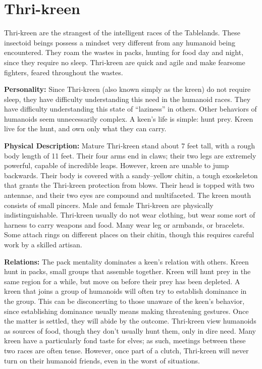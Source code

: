 \section{Thri-kreen}

Thri‐kreen are the strangest of the intelligent races of the Tablelands. These insectoid beings possess a mindset very different from any humanoid being encountered. They roam the wastes in packs, hunting for food day and night, since they require no sleep. Thri‐kreen are quick and agile and make fearsome fighters, feared throughout the wastes.

\textbf{Personality:} Since Thri‐kreen (also known simply as the kreen) do not require sleep, they have difficulty understanding this need in the humanoid races. They have difficulty understanding this state of “laziness” in others. Other behaviors of humanoids seem unnecessarily complex. A keen’s life is simple: hunt prey. Kreen live for the hunt, and own only what they can carry.

\textbf{Physical Description:} Mature Thri‐kreen stand about 7 feet tall, with a rough body length of 11 feet. Their four arms end in claws; their two legs are extremely powerful, capable of incredible leaps. However, kreen are unable to jump backwards. Their body is covered with a sandy–yellow chitin, a tough exoskeleton that grants the Thri‐kreen protection from blows. Their head is topped with two antennae, and their two eyes are compound and multifaceted. The kreen mouth consists of small pincers. Male and female Thri‐kreen are physically indistinguishable. Thri‐kreen usually do not wear clothing, but wear some sort of harness to carry weapons and food. Many wear leg or armbands, or bracelets. Some attach rings on different places on their chitin, though this requires careful work by a skilled artisan.

\textbf{Relations:} The pack mentality dominates a keen’s relation with others. Kreen hunt in packs, small groups that assemble together. Kreen will hunt prey in the same region for a while, but move on before their prey has been depleted. A kreen that joins a group of humanoids will often try to establish dominance in the group. This can be disconcerting to those unaware of the keen’s behavior, since establishing dominance usually means making threatening gestures. Once the matter is settled, they will abide by the outcome. Thri‐kreen view humanoids as sources of food, though they don’t usually hunt them, only in dire need. Many kreen have a particularly fond taste for elves; as such, meetings between these two races are often tense. However, once part of a clutch, Thri‐kreen will never turn on their humanoid friends, even in the worst of situations.

